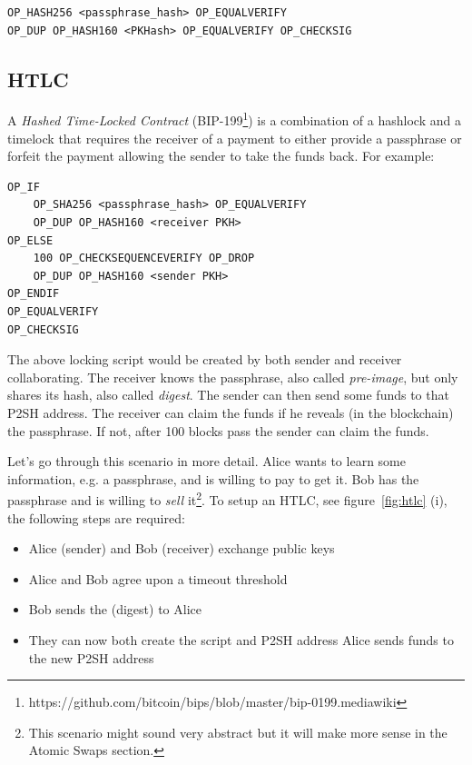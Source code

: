 \begin{emphbox}
\begin{lstlisting}[style=Pseudomath]
OP_HASH256 <passphrase_hash> OP_EQUALVERIFY 
OP_DUP OP_HASH160 <PKHash> OP_EQUALVERIFY OP_CHECKSIG
\end{lstlisting}
\end{emphbox}


\subsection*{HTLC}
\label{ssec:htlc}
A \emph{Hashed Time-Locked Contract} (BIP-199\footnote{https://github.com/bitcoin/bips/blob/master/bip-0199.mediawiki}) is a combination of a hashlock and a timelock that requires the receiver of a payment to either provide a passphrase or forfeit the payment allowing the sender to take the funds back. For example:

\begin{emphbox}
\begin{lstlisting}[style=Pseudomath]
OP_IF
    OP_SHA256 <passphrase_hash> OP_EQUALVERIFY 
    OP_DUP OP_HASH160 <receiver PKH>
OP_ELSE
    100 OP_CHECKSEQUENCEVERIFY OP_DROP 
    OP_DUP OP_HASH160 <sender PKH>
OP_ENDIF
OP_EQUALVERIFY
OP_CHECKSIG
\end{lstlisting}
\end{emphbox}

The above locking script would be created by both sender and receiver collaborating. The receiver knows the passphrase, also called \emph{pre-image}, but only shares its hash, also called \emph{digest}. The sender can then send some funds to that P2SH address. The receiver can claim the funds if he reveals (in the blockchain) the passphrase. If not, after 100 blocks pass the sender can claim the funds.

Let's go through this scenario in more detail. Alice wants to learn some information, e.g. a passphrase, and is willing to pay to get it. Bob has the passphrase and is willing to \emph{sell} it\footnote{This scenario might sound very abstract but it will make more sense in the Atomic Swaps section.}. To setup an HTLC, see figure~\ref{fig:htlc} (i), the following steps are required:

\begin{itemize}
\item Alice (sender) and Bob (receiver) exchange public keys
\item Alice and Bob agree upon a timeout threshold
\item Bob sends the  (digest) to Alice
\item They can now both create the script and P2SH address
Alice sends funds to the new P2SH address
\end{itemize}

